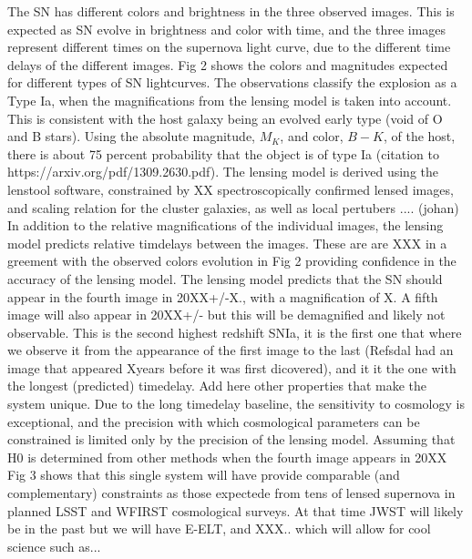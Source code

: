 \documentclass[fleqn,10pt]{wlscirep}
\begin{document}
 The SN has different colors and brightness in the three observed images. This is expected as SN evolve in brightness and color with time, and the three images represent different times on the supernova light curve, due to the different time delays of the different images. Fig 2 shows the colors and magnitudes expected for different types of SN lightcurves. The observations classify the explosion as a Type Ia, when the magnifications from the lensing model is taken into account. This is consistent with the host galaxy being an evolved early type (void of O and B stars). Using the absolute magnitude, $M_K$, and color, $B-K$, of the host, there is about 75 percent probability that the object is of type Ia (citation to https://arxiv.org/pdf/1309.2630.pdf).
\newline
\newline
{} The lensing model is derived using the lenstool software, constrained by XX spectroscopically confirmed lensed images, and scaling relation for the cluster galaxies, as well as local pertubers .... (johan)
\newline
\newline
{} In addition to the relative magnifications of the individual images, the lensing model predicts relative timdelays between the images. These are are XXX in a greement with the observed colors evolution in Fig 2 providing confidence in the accuracy of the lensing model. The lensing model predicts that the SN should appear in the fourth image in 20XX+/-X., with a magnification of X. A fifth image will also appear in 20XX+/- but this will be demagnified and likely not observable.
\newline
\newline
This is the second highest redshift SNIa, it is the first one that where we observe it from the appearance of the first image to the last (Refsdal had an image that appeared Xyears before it was first dicovered), and it it the one with the longest (predicted) timedelay.  Add here other properties that make the system unique.
\newline
\newline
{} Due to the long timedelay baseline, the sensitivity to cosmology is exceptional, and the precision with which cosmological parameters can be constrained is limited only by the precision of the lensing model. Assuming that H0 is determined from other methods when the fourth image appears in 20XX Fig 3 shows that this single system will have provide comparable (and complementary) constraints as those expectede from tens of lensed supernova in planned LSST and WFIRST cosmological surveys. At that time JWST will likely be in the past but we will have E-ELT, and XXX.. which will allow for cool science such as...
\end{document}
